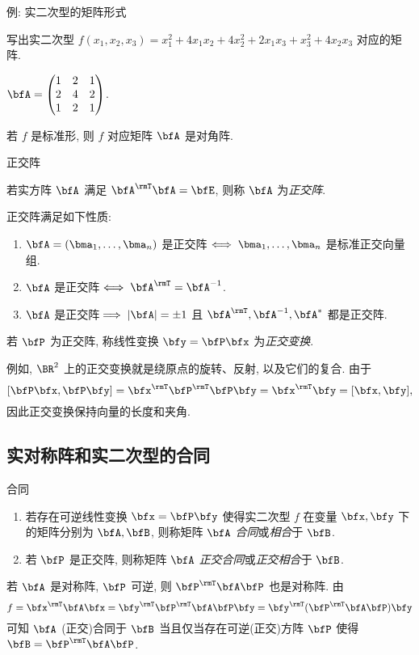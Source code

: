 \begin{frame}{例: 实二次型的矩阵形式}
	\onslide<+->
	\begin{example}
		写出实二次型 $f(x_1,x_2,x_3)=x_1^2+4x_1x_2+4x_2^2+2x_1x_3+x_3^2+4x_2x_3$ 对应的矩阵.
	\end{example}
	\onslide<+->
	\begin{solution}
		$\bfA=\begin{pmatrix}
			1&2&1\\
			2&4&2\\
			1&2&1
		\end{pmatrix}$.
	\end{solution}
	\onslide<+->
	若 $f$ 是标准形, 则 $f$ 对应矩阵 $\bfA$ 是对角阵.
\end{frame}


\begin{frame}{正交阵}
	\onslide<+->
	\begin{definition}
		若实方阵 $\bfA$ 满足 $\bfA^\rmT\bfA=\bfE$, 则称 $\bfA$ 为\emph{正交阵}.
	\end{definition}
	\onslide<+->
	正交阵满足如下性质:
	\begin{enumerate}\bf
		\item $\bfA=(\bma_1,\dots,\bma_n)$ 是正交阵$\iff \bma_1,\dots,\bma_n$ 是标准正交向量组.
		\item $\bfA$ 是正交阵$\iff\bfA^\rmT=\bfA^{-1}$.
		\item $\bfA$ 是正交阵$\implies|\bfA|=\pm1$ 且 $\bfA^\rmT,\bfA^{-1},\bfA^*$ 都是正交阵.
	\end{enumerate}
	\onslide<+->
	\begin{definition}
		若 $\bfP$ 为正交阵, 称线性变换 $\bfy=\bfP\bfx$ 为\emph{正交变换}.
	\end{definition}
	\onslide<+->
	例如, $\BR^2$ 上的正交变换就是绕原点的旋转、反射, 以及它们的复合.
	\onslide<+->
	由于
	\[[\bfP\bfx,\bfP\bfy]=\bfx^\rmT\bfP^\rmT\bfP\bfy=\bfx^\rmT\bfy=[\bfx,\bfy],\]
	因此\alert{正交变换保持向量的长度和夹角}.
\end{frame}


\subsection{实对称阵和实二次型的合同}
\begin{frame}{合同}
	\onslide<+->
	\begin{definition}
		\begin{enumerate}
			\item 若存在可逆线性变换 $\bfx=\bfP\bfy$ 使得实二次型 $f$ 在变量 $\bfx,\bfy$ 下的矩阵分别为 $\bfA,\bfB$, 则称矩阵 $\bfA$ \emph{合同}或\emph{相合}于 $\bfB$.
			\item 若 $\bfP$ 是正交阵, 则称矩阵 $\bfA$ \emph{正交合同}或\emph{正交相合}于 $\bfB$.
		\end{enumerate}
	\end{definition}
	\onslide<+->
	若 $\bfA$ 是对称阵, $\bfP$ 可逆, 则 $\bfP^\rmT\bfA\bfP$ 也是对称阵.
	\onslide<+->
	由
	\[f=\bfx^\rmT\bfA\bfx=\bfy^\rmT\bfP^\rmT\bfA\bfP\bfy
	=\bfy^\rmT(\bfP^\rmT\bfA\bfP)\bfy\]
	可知 $\bfA$ (正交)合同于 $\bfB$ 当且仅当存在可逆(正交)方阵 $\bfP$ 使得 $\bfB=\bfP^\rmT\bfA\bfP$.
\end{frame}


